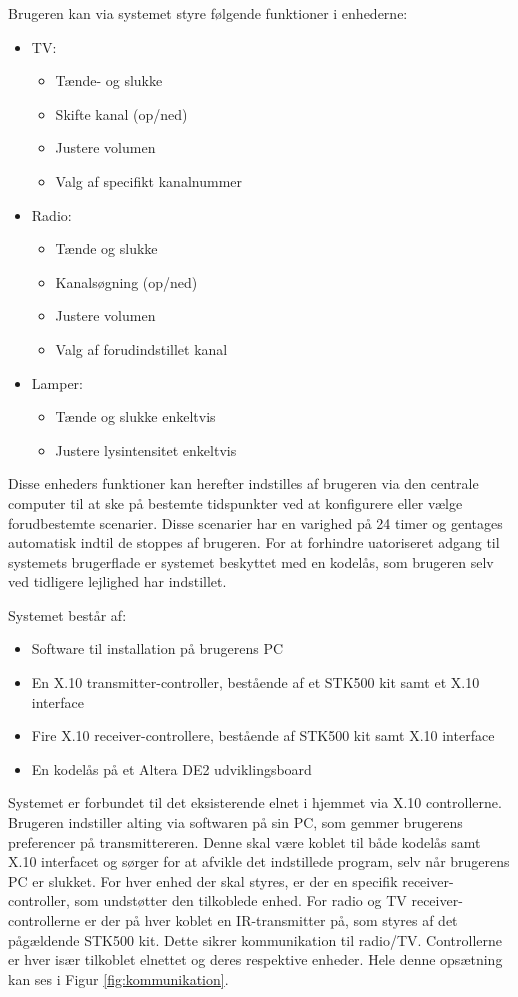 Brugeren kan via systemet styre følgende funktioner i enhederne:
\begin{itemize}
\item TV:
\begin{itemize}
\item Tænde- og slukke
\item Skifte kanal (op/ned)
\item Justere volumen 
\item Valg af specifikt kanalnummer
\end{itemize}

\item Radio:
\begin{itemize}
\item Tænde og slukke
\item Kanalsøgning (op/ned)
\item Justere volumen
\item Valg af forudindstillet kanal
\end{itemize}

\item Lamper:
\begin{itemize}
\item Tænde og slukke enkeltvis
\item Justere lysintensitet enkeltvis
\end{itemize}
\end{itemize}

Disse enheders funktioner kan herefter indstilles af brugeren via den centrale computer til at ske på bestemte tidspunkter ved at konfigurere eller vælge forudbestemte scenarier. Disse scenarier har en varighed på 24 timer og gentages automatisk indtil de stoppes af brugeren.
For at forhindre uatoriseret adgang til systemets brugerflade er systemet beskyttet med en kodelås, som brugeren selv ved tidligere lejlighed har indstillet.

Systemet består af:
\begin{itemize}
\item Software til installation på brugerens PC
\item En X.10 transmitter-controller, bestående af et STK500 kit samt et X.10 interface
\item Fire X.10 receiver-controllere, bestående af STK500 kit samt X.10 interface
\item En kodelås på et Altera DE2 udviklingsboard
\end{itemize}

Systemet er forbundet til det eksisterende elnet i hjemmet via X.10 controllerne. Brugeren indstiller alting via softwaren på sin PC, som gemmer brugerens preferencer på transmittereren. Denne skal være koblet til både kodelås samt X.10 interfacet og sørger for at afvikle det indstillede program, selv når brugerens PC er slukket. For hver enhed der skal styres, er der en specifik receiver-controller, som undstøtter den tilkoblede enhed. For radio og TV receiver-controllerne er der på hver koblet en IR-transmitter på, som styres af det pågældende STK500 kit. Dette sikrer kommunikation til radio/TV. Controllerne er hver især tilkoblet elnettet og deres respektive enheder. Hele denne opsætning kan ses i Figur \ref{fig:kommunikation}.

